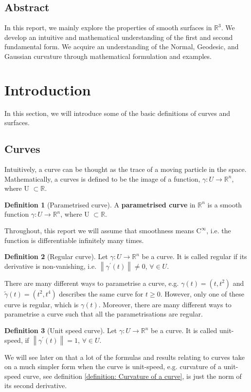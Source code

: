 \documentclass{article}
\theoremstyle{plain}
\theoremstyle{definition}
\newtheorem{definition}{Definition}
\theoremstyle{remark}
\newcommand{\R}{\mathbb{R}}
\begin{document}
\subsection*{Abstract}
In this report, we mainly explore the properties of smooth surfaces in \( \R^3 \). We develop an intuitive and mathematical understanding of the first and second fundamental form. We acquire an understanding of the Normal, Geodesic, and Gaussian curvature through mathematical formulation and examples.

\newpage

\tableofcontents


\section{Introduction}
In this section, we will introduce some of the basic definitions of curves and surfaces.
\subsection{Curves}
Intuitively, a curve can be thought as the trace of a moving particle in the space. Mathematically, a curves is defined to be the image of a function, \( \gamma: U \rightarrow \R^n \), where U \( \subset \R \).

\begin{definition}[Parametrised curve]
    A \textbf{parametrised curve} in \( \R^n \) is a smooth function \( \gamma: U \rightarrow \R^n \), where U \( \subset \R \).
\end{definition}
Throughout, this report we will assume that smoothness means \( \text{C}^\infty \), i.e. the function is differentiable infinitely many times.

\begin{definition}[Regular curve]
    Let \( \gamma: U \rightarrow \R^n \) be a curve. It is called regular if its derivative is non-vanishing, i.e. \( \left\lVert  \gamma^\prime(t) \right\rVert \neq 0 \), \( \forall \in U \).
\end{definition}

There are many different ways to parametrise a curve, e.g. \( \gamma(t) = (t, t^2)\) and \( \tilde{\gamma}(t) = (t^2, t^4)\) describes the same curve for \(t \geq 0 \). However, only one of these curve is regular, which is \( \gamma(t) \). Moreover, there are many different ways to parametrise a curve such that all the parametrisations are regular.

\begin{definition}[Unit speed curve]
    Let \( \gamma: U \rightarrow \R^n \) be a curve. It is called unit-speed, if \( \left\lVert  \gamma^\prime(t) \right\rVert = 1 \), \( \forall \in U \).
\end{definition}
We will see later on that a lot of the formulas and results relating to curves take on a much simpler form when the curve is unit-speed, e.g. curvature of a unit-speed curve, see definition \ref{definition: Curvature of a curve}, is just the norm of its second derivative.
\end{document}
